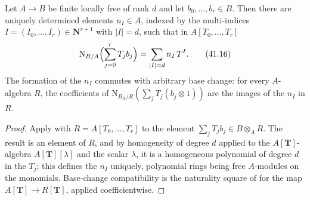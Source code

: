 \begin{lemma}
\label{lem:ch41-universal-polynomial}
Let $A\to B$ be finite locally free of rank $d$ and let
$b_0,\dots,b_r\in B$.  Then there are uniquely determined elements
$n_I\in A$, indexed by the multi-indices
$I=(I_0,\dots,I_r)\in\mathbf N^{r+1}$ with $|I|=d$, such that in
$A[T_0,\dots,T_r]$
\[
 \mathrm N_{B/A}\Bigl(\sum_{j=0}^rT_jb_j\Bigr)
 =\sum_{|I|=d}n_I\,T^I .
\tag{41.16}\label{eq:ch41-universal-coefficients}
\]
The formation of the $n_I$ commutes with arbitrary base change: for every
$A$-algebra $R$, the coefficients of
$\mathrm N_{B_R/R}(\sum_jT_j(b_j\otimes1))$ are the images of the
$n_I$ in $R$.
\end{lemma}

\begin{proof}
Apply  with $R=A[T_0,\dots,T_r]$ to the element
$\sum_jT_jb_j\in B\otimes_AR$.  The result is an element of $R$, and by
homogeneity of degree $d$ applied to the $A[\mathbf T]$-algebra
$A[\mathbf T][\lambda]$ and the scalar $\lambda$, it is a homogeneous
polynomial of degree $d$ in the $T_j$; this defines the $n_I$
uniquely, polynomial rings being free $A$-modules on the monomials.
Base-change compatibility is the naturality square of
 for the map
$A[\mathbf T]\to R[\mathbf T]$, applied coefficientwise.
\end{proof}

